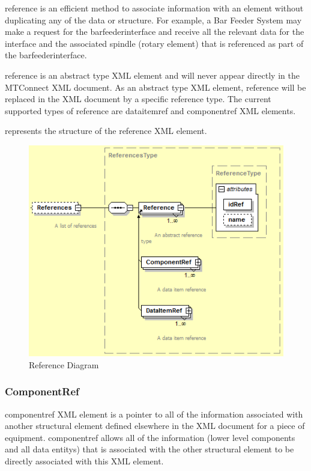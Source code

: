 \documentclass{mtconnect}	%
\begin{document}
\gls{reference} is an efficient method to associate information with an element without duplicating any of the data or structure.  For example, a Bar Feeder System may make a request for the \gls{barfeederinterface} and receive all the relevant data for the interface and the associated spindle (\gls{rotary} element) that is referenced as part of the \gls{barfeederinterface}.

\gls{reference} is an abstract type XML element and will never appear directly in the MTConnect XML document.  As an abstract type XML element, \gls{reference} will be replaced in the XML document by a specific \gls{reference} type.  The current supported types of \gls{reference} are \gls{dataitemref} and \gls{componentref} XML elements.

 represents the structure of the \gls{reference} XML element.

\begin{figure}[ht]
  \centering
  \includegraphics[width=.75\textwidth]{figures/reference-schema-diagram.png}
  \caption{Reference Diagram}
  \label{fig:reference-schema-diagram}
\end{figure}
\FloatBarrier

\subsubsection{ComponentRef}

\gls{componentref} XML element is a pointer to all of the information associated with another \gls{structural element} defined elsewhere in the XML document for a piece of equipment.  \gls{componentref} allows all of the information (\gls{lower level} \gls{components} and all \glspl{data entity}) that is associated with the other \gls{structural element} to be directly associated with this XML element.
\end{document}

